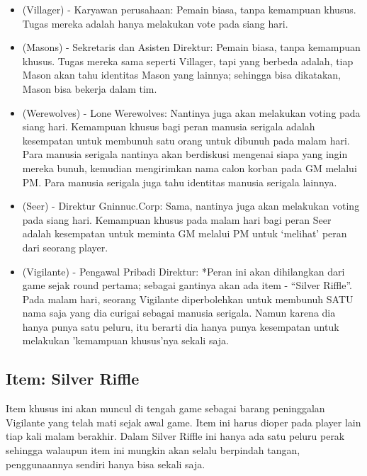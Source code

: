 \documentclass[]{book}
\begin{document}
\begin{itemize}
\item
  (Villager) - Karyawan perusahaan: Pemain biasa, tanpa kemampuan
  khusus. Tugas mereka adalah hanya melakukan vote pada siang hari.
\item
  (Masons) - Sekretaris dan Asisten Direktur: Pemain biasa, tanpa
  kemampuan khusus. Tugas mereka sama seperti Villager, tapi yang
  berbeda adalah, tiap Mason akan tahu identitas Mason yang lainnya;
  sehingga bisa dikatakan, Mason bisa bekerja dalam tim.
\item
  (Werewolves) - Lone Werewolves: Nantinya juga akan melakukan voting
  pada siang hari. Kemampuan khusus bagi peran manusia serigala adalah
  kesempatan untuk membunuh satu orang untuk dibunuh pada malam hari.
  Para manusia serigala nantinya akan berdiskusi mengenai siapa yang
  ingin mereka bunuh, kemudian mengirimkan nama calon korban pada GM
  melalui PM. Para manusia serigala juga tahu identitas manusia serigala
  lainnya.
\item
  (Seer) - Direktur Gninnuc.Corp: Sama, nantinya juga akan melakukan
  voting pada siang hari. Kemampuan khusus pada malam hari bagi peran
  Seer adalah kesempatan untuk meminta GM melalui PM untuk `melihat'
  peran dari seorang player.
\item
  (Vigilante) - Pengawal Pribadi Direktur: *Peran ini akan dihilangkan
  dari game sejak round pertama; sebagai gantinya akan ada item -
  ``Silver Riffle''. Pada malam hari, seorang Vigilante diperbolehkan
  untuk membunuh SATU nama saja yang dia curigai sebagai manusia
  serigala. Namun karena dia hanya punya satu peluru, itu berarti dia
  hanya punya kesempatan untuk melakukan 'kemampuan khusus'nya sekali
  saja.
\end{itemize}

\subsection{Item: Silver Riffle}\label{item-silver-riffle}

Item khusus ini akan muncul di tengah game sebagai barang peninggalan
Vigilante yang telah mati sejak awal game. Item ini harus dioper pada
player lain tiap kali malam berakhir. Dalam Silver Riffle ini hanya ada
satu peluru perak sehingga walaupun item ini mungkin akan selalu
berpindah tangan, penggunaannya sendiri hanya bisa sekali saja.
\end{document}
